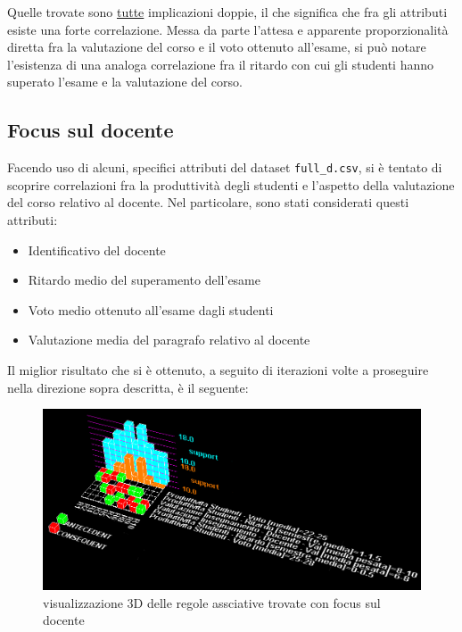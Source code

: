             Quelle trovate sono \underline{tutte} implicazioni doppie, il che significa che fra gli attributi esiste una forte correlazione. Messa da parte l'attesa e apparente proporzionalità diretta fra la valutazione del corso e il voto ottenuto all'esame, si può notare l'esistenza di una analoga correlazione fra il ritardo con cui gli studenti hanno superato l'esame e la valutazione del corso.

        \subsection{Focus sul docente}

            Facendo uso di alcuni, specifici attributi del dataset \texttt{full\_d.csv}, si è tentato di scoprire correlazioni fra la produttività degli studenti e l'aspetto della valutazione del corso relativo al docente. Nel particolare, sono stati considerati questi attributi:

            \begin{itemize}
                \item Identificativo del docente
                \item Ritardo medio del superamento dell'esame
                \item Voto medio ottenuto all'esame dagli studenti
                \item Valutazione media del paragrafo relativo al docente
            \end{itemize}

            Il miglior risultato che si è ottenuto, a seguito di iterazioni volte a proseguire nella direzione sopra descritta, è il seguente: \\

            

            \begin{figure}
                \centering
                \caption{visualizzazione 3D delle regole assciative trovate con focus sul docente}
                \label{apriori_min_2}
	            \includegraphics[scale=0.4]{../ass/apriori_min_2.png}
            \end{figure}

